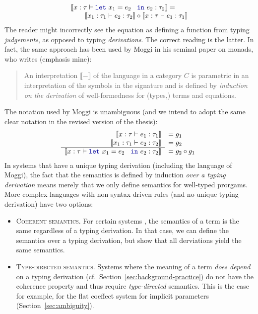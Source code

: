 \documentclass[
		twoside,openright,titlepage,numbers=noenddot,headinclude,%
                footinclude=true,cleardoublepage=empty,
                BCOR=10mm,paper=a4,fontsize=10pt, %
                ngerman,american, %
                ]{scrreprt}
\newcommand{\kvd}[1]{\textnormal{\textcolor{kvdclr}{\ttfamily #1}}}
\newcommand{\sem}[1]{\llbracket #1 \rrbracket}
\begin{document}
\begin{equation*}
\begin{array}{l}
 \sem{x:\tau \vdash \kvd{let}~x_1=e_2~\kvd{in}~e_2 : \tau_2} = \\ \qquad
 \sem{x_1:\tau_1 \vdash e_2 : \tau_2} \circ
 \sem{x:\tau \vdash e_1 : \tau_1}
\end{array}
\end{equation*}
%
The reader might incorrectly see the equation as defining a function from typing \emph{judgements},
as opposed to typing \emph{derivations}. The correct reading is the latter. In fact,
the same approach has been used by Moggi in his seminal paper on monads, who writes
\cite[p7]{monad-notions} (emphasis mine):

\begin{quotation}
\noindent
An interpretation $\sem{-}$ of the language in a category $C$ is parametric in an interpretation
of the symbols in the signature and is defined by \emph{induction on the derivation} of
well-formedness for (types,) terms and equations.
\end{quotation}

\noindent
The notation used by Moggi is unambiguous (and we intend to adopt the same clear notation in the
revised version of the thesis):
%
\begin{equation*}
  \begin{array}{r}
    \sem{x:\tau \vdash e_1 : \tau_1} \\
    \sem{x_1:\tau_1 \vdash e_2 : \tau_2} \\ \hline
    \sem{x:\tau \vdash \kvd{let}~x_1=e_2~\kvd{in}~e_2 : \tau_2}
  \end{array}
  \begin{array}{l}
    = g_1 \\
    = g_2 \\
    = g_2 \circ g_1
  \end{array}
\end{equation*}
%
In systems that have a unique typing derivation (including the language of Moggi), the fact that
the semantics is defined by induction \emph{over a typing derivation} means merely that we only
define semantics for well-typed prorgams. More complex languages with non-syntax-driven rules
(and no unique typing derivation) have two options:

\begin{itemize}
\item \textsc{Coherent semantics.} For certain systems \cite{semantics-bltres}, the semantics of
  a term is the same regardless of a typing derivation. In that case, we can define the semantics
  over a typing derivation, but show that all derviations yield the same semantics.

\item \textsc{Type-directed semantics.} Systems where the meaning of a term \emph{does depend}
  on a typing derivation (cf.~Section~\ref{sec:background-practice}) do not have the coherence
  property and thus require \emph{type-directed} semantics. This is the case for example,
  for the flat coeffect system for implicit parameters (Section~\ref{sec:ambiguity}).
\end{itemize}
\end{document}
